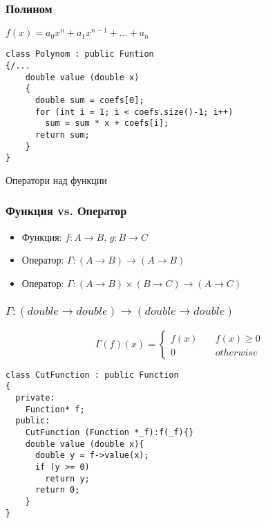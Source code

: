 \documentclass{beamer}
\begin{document}
\begin{frame}[fragile]
\frametitle{Полином}

\begin{center}

$f(x) = a_0x^n + a_1x^{n-1}+...+a_n$

\begin{lstlisting}
class Polynom : public Funtion
{/...
    double value (double x)
    {
      double sum = coefs[0];
      for (int i = 1; i < coefs.size()-1; i++)
        sum = sum * x + coefs[i];
      return sum;
    }
}
\end{lstlisting}

\end{center}


\end{frame}




\begin{frame}
\centerline{Оператори над функции}
\end{frame}


\begin{frame}[fragile]
\frametitle{Функция vs. Оператор}

\begin{itemize}
  \item Функция: $f:A\rightarrow B$, $g:B\rightarrow C$
  \item Оператор: $\Gamma:(A\rightarrow B)\rightarrow (A\rightarrow B)$
  \item Оператор: $\Gamma:(A\rightarrow B)\times(B\rightarrow C)\rightarrow (A\rightarrow C)$
\end{itemize}

\end{frame}



\begin{frame}[fragile]
\frametitle{$\Gamma:(double \rightarrow double)\rightarrow(double \rightarrow double)$}

\begin{center}
$$
\Gamma(f)(x) = \left\{
        \begin{array}{ll}
            f(x) & \quad f(x) \geq 0 \\
            0 & \quad otherwise
        \end{array}
    \right.
$$

\begin{lstlisting}
class CutFunction : public Function
{
  private:
    Function* f;
  public:
    CutFunction (Function *_f):f(_f){}
    double value (double x){
      double y = f->value(x);
      if (y >= 0)
        return y;
      return 0;
    }
}
\end{lstlisting}

\end{center}


\end{frame}
\end{document}
